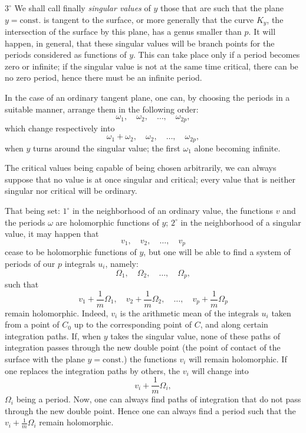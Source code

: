 \documentclass{article}
\begin{document}
$3^\circ$ We shall call finally \emph{singular values} of $y$ those that are such that the plane $y = \text{const.}$ is tangent to the surface, or more generally that the curve $K_{y}$, the intersection of the surface by this plane, has a genus smaller than $p$. It will happen, in general, that these singular values will be branch points for the periods considered as functions of $y$. This can take place only if a period becomes zero or infinite; if the singular value is not at the same time critical, there can be no zero period, hence there must be an infinite period.

In the case of an ordinary tangent plane, one can, by choosing the periods in a suitable manner, arrange them in the following order:
\[
\omega_{1}, \quad \omega_{2}, \quad \ldots, \quad \omega_{2p},
\]
which change respectively into
\[
\omega_{1} + \omega_{2}, \quad \omega_{2}, \quad \ldots, \quad \omega_{2p},
\]
when $y$ turns around the singular value; the first $\omega_{1}$ alone becoming infinite.

The critical values being capable of being chosen arbitrarily, we can always suppose that no value is at once singular and critical; every value that is neither singular nor critical will be ordinary.

That being set: $1^\circ$ in the neighborhood of an ordinary value, the functions $v$ and the periods $\omega$ are holomorphic functions of $y$; $2^\circ$ in the neighborhood of a singular value, it may happen that
\[
v_{1}, \quad v_{2}, \quad \ldots, \quad v_{p}
\]
cease to be holomorphic functions of $y$, but one will be able to find a system of periods of our $p$ integrals $u_{i}$, namely:
\[
\Omega_{1}, \quad \Omega_{2}, \quad \ldots, \quad \Omega_{p},
\]
such that
\[
v_{1} + \frac{1}{m} \Omega_{1}, \quad v_{2} + \frac{1}{m} \Omega_{2}, \quad \ldots, \quad v_{p} + \frac{1}{m} \Omega_{p}
\]
remain holomorphic. Indeed, $v_{i}$ is the arithmetic mean of the integrals $u_{i}$ taken from a point of $C_{0}$ up to the corresponding point of $C$, and along certain integration paths. If, when $y$ takes the singular value, none of these paths of integration passes through the new double point (the point of contact of the surface with the plane $y = \text{const.}$) the functions $v_{i}$ will remain holomorphic. If one replaces the integration paths by others, the $v_{i}$ will change into
\[
v_{i} + \frac{1}{m} \Omega_{i},
\]
$\Omega_{i}$ being a period. Now, one can always find paths of integration that do not pass through the new double point. Hence one can always find a period such that the $v_{i} + \frac{1}{m} \Omega_{i}$ remain holomorphic.
\end{document}
